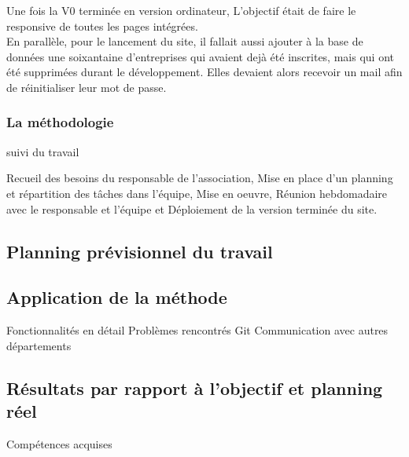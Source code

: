 Une fois la V0 terminée en version ordinateur, L'objectif était de faire le responsive de toutes les pages intégrées. 
\\
En parallèle, pour le lancement du site, il fallait aussi ajouter à la base de données une soixantaine d'entreprises qui avaient dejà été inscrites, mais qui ont été supprimées durant le développement.
Elles devaient alors recevoir un mail afin de réinitialiser leur mot de passe.

\subsubsection{La méthodologie}

suivi du travail

Recueil des besoins du responsable de l’association, Mise en place d’un planning et
répartition des tâches dans l’équipe, Mise en oeuvre, Réunion hebdomadaire avec le
responsable et l’équipe et Déploiement de la version terminée du site.


\pagebreak
\subsection{Planning prévisionnel du travail}
\pagebreak
\subsection{Application de la méthode}

Fonctionnalités en détail
Problèmes rencontrés
Git
Communication avec autres départements

\pagebreak
\subsection{Résultats par rapport à l'objectif et planning réel}
Compétences acquises




